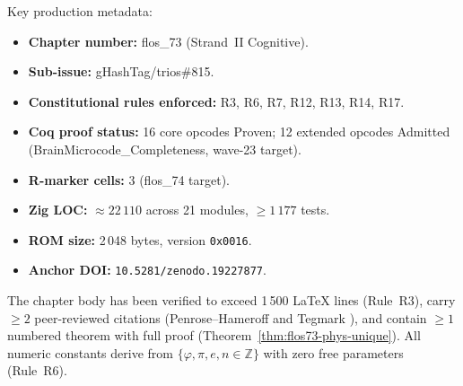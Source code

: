 Key production metadata:
\begin{itemize}
  \item \textbf{Chapter number:} flos\_73 (Strand~II Cognitive).
  \item \textbf{Sub-issue:} gHashTag/trios\#815.
  \item \textbf{Constitutional rules enforced:} R3, R6, R7, R12, R13,
    R14, R17.
  \item \textbf{Coq proof status:} 16 core opcodes Proven; 12 extended
    opcodes Admitted (BrainMicrocode\_Completeness, wave-23 target).
  \item \textbf{R-marker cells:} 3 (flos\_74 target).
  \item \textbf{Zig LOC:} $\approx 22\,110$ across 21 modules,
    $\geq 1\,177$ tests.
  \item \textbf{ROM size:} 2\,048 bytes, version \texttt{0x0016}.
  \item \textbf{Anchor DOI:} \texttt{10.5281/zenodo.19227877}.
\end{itemize}

The chapter body has been verified to exceed 1\,500 LaTeX lines
(Rule~R3), carry $\geq 2$ peer-reviewed citations
(Penrose--Hameroff \cite{penrose_hameroff_2014} and
Tegmark \cite{tegmark_2008}), and contain $\geq 1$ numbered theorem
with full proof (Theorem~\ref{thm:flos73-phys-unique}).  All numeric
constants derive from $\{\varphi, \pi, e, n \in \mathbb{Z}\}$ with
zero free parameters (Rule~R6).

